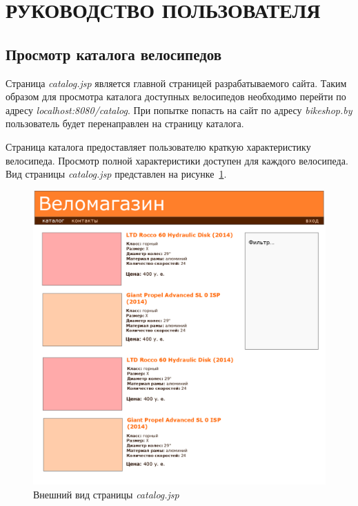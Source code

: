 \section[Руководство пользователя]{РУКОВОДСТВО ПОЛЬЗОВАТЕЛЯ}

\subsection{Просмотр каталога велосипедов}

Страница \textit{catalog.jsp} является главной страницей разрабатываемого сайта.
Таким образом для просмотра каталога доступных велосипедов необходимо перейти
по адресу \textit{localhost:8080/catalog}. При попытке попасть на сайт по адресу
\textit{bikeshop.by} пользователь будет перенаправлен на страницу каталога.

Страница каталога предоставляет пользователю краткую характеристику велосипеда.
Просмотр полной характеристики доступен для каждого велосипеда.
Вид страницы \textit{catalog.jsp} представлен на рисунке~\ref{fig:catalog_jsp}.

\begin{figure}[h]
  \centering
  \includegraphics[width=130mm]{pic/catalog_template.png}
  \caption{Внешний вид страницы \textit{catalog.jsp}}
  \label{fig:catalog_jsp}
\end{figure}

